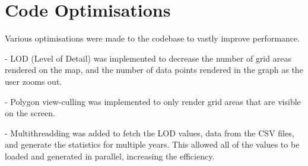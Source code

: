 \documentclass[../main.tex]{subfiles}
\begin{document}
\section{Code Optimisations}
Various optimisations were made to the codebase to vastly improve performance.

    - LOD (Level of Detail) was implemented to decrease the number of grid areas rendered on the map, and the number of data points rendered in the graph as the user zooms out. 
    
    - Polygon view-culling was implemented to only render grid areas that are visible on the screen.
    
    - Multithreadding was added to fetch the LOD values, data from the CSV files, and generate the statistics for multiple years. This allowed all of the values to be loaded and generated in parallel, increasing the efficiency.
\end{document}
